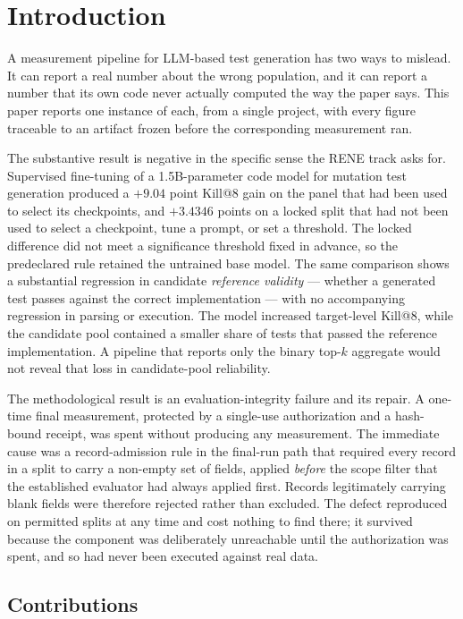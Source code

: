 \documentclass[10pt,conference]{IEEEtran}
\makeatletter
\newcommand{\killk}[1]{Kill@#1}
\makeatother
\begin{document}
\section{Introduction}

A measurement pipeline for LLM-based test generation has two ways to mislead.
It can report a real number about the wrong population, and it can report a
number that its own code never actually computed the way the paper says. This
paper reports one instance of each, from a single project, with every figure
traceable to an artifact frozen before the corresponding measurement ran.

The substantive result is negative in the specific sense the RENE track asks
for. Supervised fine-tuning of a 1.5B-parameter code model for mutation test
generation produced a $+9.04$ point \killk{8} gain on the panel that had been
used to select its checkpoints, and $+3.4346$ points on a locked split that had
not been used to select a checkpoint, tune a prompt, or set a threshold. The
locked difference did not meet a significance threshold
fixed in advance, so the predeclared rule retained the untrained base model.
The same comparison shows a substantial regression in candidate
\emph{reference validity} --- whether a generated test passes against the
correct implementation --- with no accompanying regression in parsing or
execution. The model increased target-level \killk{8}, while the candidate pool
contained a smaller share of tests that passed the reference implementation.
A pipeline that reports only the binary top-$k$ aggregate would not reveal that
loss in candidate-pool reliability.

The methodological result is an evaluation-integrity failure and its repair. A
one-time final measurement, protected by a single-use authorization and a
hash-bound receipt, was spent without producing any measurement. The immediate
cause was a record-admission rule in the final-run path that required every
record in a split to carry a non-empty set of fields, applied \emph{before} the
scope filter that the established evaluator had always applied first. Records
legitimately carrying blank fields were therefore rejected rather than excluded.
The defect reproduced on permitted splits at any time and cost nothing to find
there; it survived because the component was deliberately unreachable until the
authorization was spent, and so had never been executed against real data.

\subsection*{Contributions}
\end{document}
